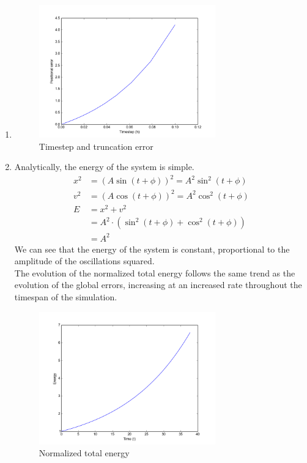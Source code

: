 \documentclass[11pt]{article}
\begin{document}
\begin{enumerate}
\item
\begin{figure}[H]
\centering
\includegraphics[width=3in]{img/truncation.png}
\caption{Timestep and truncation error}
\end{figure}

\item
Analytically, the energy of the system is simple. 
\begin{align*}
x^2 &= (A \sin (t + \phi))^2 = A^2 \sin^2 (t + \phi) \\
v^2 &= (A \cos (t + \phi))^2 = A^2 \cos^2 (t + \phi) \\
E &= x^2 + v^2 \\
&= A^2 \cdot \left( \sin^2 (t + \phi) + \cos^2 (t + \phi) \right) \\
&= A^2
\end{align*}
We can see that the energy of the system is constant, proportional to the amplitude of the oscillations squared. \\
The evolution of the normalized total energy follows the same trend as the evolution of the global errors, increasing at an increased rate throughout the timespan of the simulation.
\begin{figure}[H]
\centering
\includegraphics[width=3in]{img/energy.png}
\caption{Normalized total energy}
\end{figure}


\end{enumerate}
\end{document}
